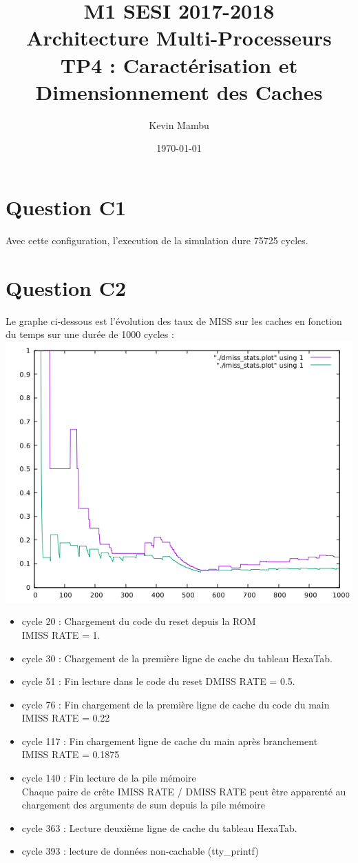 \documentclass[10pt]{article}
\author{Kevin Mambu}
\date{\today}
\title{M1 SESI 2017-2018\\Architecture Multi-Processeurs\\TP4 : Caractérisation
et Dimensionnement des Caches}
\begin{document}
\maketitle

\section{Question C1}
Avec cette configuration, l'execution de la simulation dure 75725 cycles.

\section{Question C2}
Le graphe ci-dessous est l'évolution des taux de MISS sur les caches en fonction
du temps sur une durée de 1000 cycles :
\includegraphics[width=18cm]{overlay_miss_stats.png}\\

\newpage

\begin{itemize}
  \item cycle 20 : Chargement du code du reset depuis la ROM\\
  IMISS RATE = 1.
  \item cycle 30 : Chargement de la première ligne de cache du tableau HexaTab.
  \item cycle 51 : Fin lecture dans le code du reset
  DMISS RATE = 0.5.
  \item cycle 76 : Fin chargement de la première ligne de cache du code du
  main\\IMISS RATE = 0.22
  \item cycle 117 : Fin chargement ligne de cache du main après branchement\\
  IMISS RATE = 0.1875
  \item cycle 140 : Fin lecture de la pile mémoire\\
  Chaque paire de crête IMISS RATE / DMISS RATE peut être apparenté au
  chargement des arguments de sum depuis la pile mémoire
  \item cycle 363 : Lecture deuxième ligne de cache du tableau HexaTab.
  \item cycle 393 : lecture de données non-cachable (tty\_printf)
\end{itemize}
\end{document}
